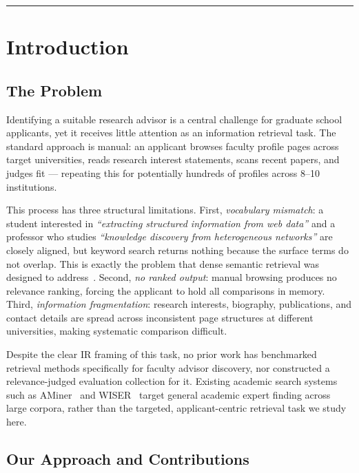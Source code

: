 \documentclass[11pt,a4paper]{article}
\begin{document}
\vspace{0.5em}
\hrule
\vspace{1em}

\section{Introduction}

\subsection{The Problem}

Identifying a suitable research advisor is a central challenge for
graduate school applicants, yet it receives little attention as an
information retrieval task.
The standard approach is manual: an applicant browses faculty profile
pages across target universities, reads research interest statements,
scans recent papers, and judges fit --- repeating this for potentially
hundreds of profiles across 8--10 institutions.

This process has three structural limitations.
First, \emph{vocabulary mismatch}: a student interested in
\textit{``extracting structured information from web data''} and a
professor who studies \textit{``knowledge discovery from heterogeneous
networks''} are closely aligned, but keyword search returns nothing
because the surface terms do not overlap.
This is exactly the problem that dense semantic retrieval was designed
to address~\cite{karpukhin2020dpr,reimers2019}.
Second, \emph{no ranked output}: manual browsing produces no relevance
ranking, forcing the applicant to hold all comparisons in memory.
Third, \emph{information fragmentation}: research interests, biography,
publications, and contact details are spread across inconsistent page
structures at different universities, making systematic comparison
difficult.

Despite the clear IR framing of this task, no prior work has
benchmarked retrieval methods specifically for faculty advisor discovery,
nor constructed a relevance-judged evaluation collection for it.
Existing academic search systems such as AMiner~\cite{tang2008arnetminer}
and WISER~\cite{cifariello2019wiser} target general academic expert
finding across large corpora, rather than the targeted, applicant-centric
retrieval task we study here.

\subsection{Our Approach and Contributions}
\end{document}
